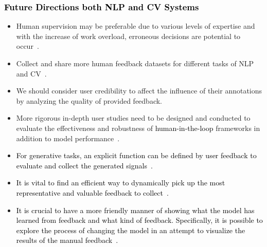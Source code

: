 \documentclass{article}
\newcommand{\REO}[1]{\textcolor{black}{#1}}
\newcommand{\ZJH}[1]{\textcolor{black}{#1}}
\begin{document}
\REO{\subsubsection{Future Directions both NLP and CV Systems}}
\begin{itemize}
\setlength{\itemsep}{0pt}
\setlength{\parsep}{0pt}
\setlength{\parskip}{0pt}
\item
Human supervision may be preferable due to various levels of expertise and with the increase of work overload, erroneous decisions are potential to occur~\cite{jwo2021smart}.

\item
Collect and share more human feedback datasets for different tasks of NLP and CV~\cite{chai2020human}.

\item
We should consider user credibility to affect the influence of their annotations by analyzing the quality of provided feedback\cite{karmakharm2019journalist}.

\item
More rigorous in-depth user studies need to be designed and conducted to evaluate the effectiveness and robustness of \REO{human-in-the-loop} frameworks in addition to model performance~\cite{smith2018closing}.

\item
\REO{For generative tasks, an explicit function can be defined by user feedback to evaluate and collect the generated signals~\cite{kreutzer2020learning}.}

\item
\REO{It is vital \ZJH{to find} an efficient way to dynamically pick up the most representative and valuable feedback to collect~\cite{settles2011closing}.}

\item
\REO{It is crucial to have a more friendly manner of showing what the model has learned from feedback and what kind of feedback. Specifically, it is possible to explore the process of changing the model in an attempt to visualize the results of the manual feedback~\cite{lee2017human}.}

\end{itemize}
\end{document}
